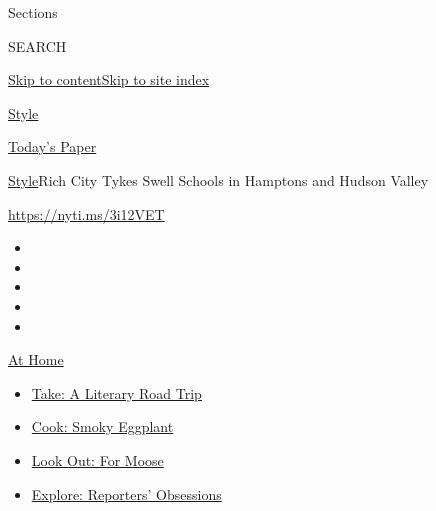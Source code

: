 Sections

SEARCH

\protect\hyperlink{site-content}{Skip to
content}\protect\hyperlink{site-index}{Skip to site index}

\href{https://www.nytimes3xbfgragh.onion/section/style}{Style}

\href{https://myaccount.nytimes3xbfgragh.onion/auth/login?response_type=cookie\&client_id=vi}{}

\href{https://www.nytimes3xbfgragh.onion/section/todayspaper}{Today's
Paper}

\href{/section/style}{Style}\textbar{}Rich City Tykes Swell Schools in
Hamptons and Hudson Valley

\url{https://nyti.ms/3i12VET}

\begin{itemize}
\item
\item
\item
\item
\item
\end{itemize}

\href{https://www.nytimes3xbfgragh.onion/spotlight/at-home?action=click\&pgtype=Article\&state=default\&region=TOP_BANNER\&context=at_home_menu}{At
Home}

\begin{itemize}
\tightlist
\item
  \href{https://www.nytimes3xbfgragh.onion/2020/07/28/books/time-for-a-literary-road-trip.html?action=click\&pgtype=Article\&state=default\&region=TOP_BANNER\&context=at_home_menu}{Take:
  A Literary Road Trip}
\item
  \href{https://www.nytimes3xbfgragh.onion/2020/07/29/magazine/bored-with-your-home-cooking-some-smoky-eggplant-will-fix-that.html?action=click\&pgtype=Article\&state=default\&region=TOP_BANNER\&context=at_home_menu}{Cook:
  Smoky Eggplant}
\item
  \href{https://www.nytimes3xbfgragh.onion/2020/07/27/travel/moose-michigan-isle-royale.html?action=click\&pgtype=Article\&state=default\&region=TOP_BANNER\&context=at_home_menu}{Look
  Out: For Moose}
\item
  \href{https://www.nytimes3xbfgragh.onion/interactive/2020/at-home/even-more-reporters-editors-diaries-lists-recommendations.html?action=click\&pgtype=Article\&state=default\&region=TOP_BANNER\&context=at_home_menu}{Explore:
  Reporters' Obsessions}
\end{itemize}

